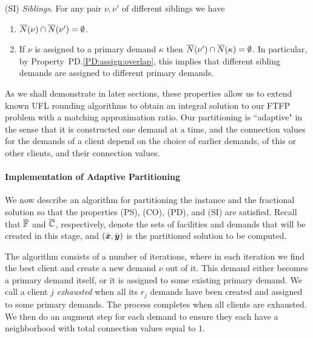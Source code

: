 \documentclass[11pt]{article}
\begin{document}
\begin{description}
\begin{enumerate}
\begin{enumerate}
			\end{enumerate}

	\end{enumerate}
	
\item{(SI)} \emph{Siblings}. For any pair $\nu,\nu'$ of different siblings we have
  \begin{enumerate}

	\item \label{SI:siblings disjoint}
		  ${\overline{N}}(\nu)\cap {\overline{N}}(\nu') = \emptyset$.
		
	\item \label{SI:primary disjoint} If $\nu$ is assigned to a primary demand $\kappa$ then
 		${\overline{N}}(\nu')\cap {\overline{N}}(\kappa) = \emptyset$. In particular, by Property~PD.\ref{PD:assign:overlap},
		this implies that different sibling demands are assigned to different primary demands.

	\end{enumerate}
	
\end{description}

As we shall demonstrate in later sections, these properties
allow us to extend known UFL rounding algorithms to obtain
an integral solution to our FTFP problem with a matching
approximation ratio. Our partitioning is ``adaptive" in the
sense that it is constructed one demand at a time, and the
connection values for the demands of a client depend on the choice of
earlier demands, of this or other clients, and their connection values.


\paragraph{Implementation of Adaptive Partitioning}
We now describe an algorithm for partitioning the instance
and the fractional solution so that the properties (PS),
(CO), (PD), and (SI) are satisfied.  Recall that
$\overline{\mathbb{F}}$ and $\overline{\mathbb{C}}$, respectively, denote the
sets of facilities and demands that will be created in this
stage, and $(\bar{\boldsymbol{x}},\bar{\boldsymbol{y}})$ is the partitioned solution
to be computed.

The algorithm consists of a number of iterations, where in
each iteration we find the best client and create a new demand
$\nu$ out of it. This demand either becomes a primary demand
itself, or it is assigned to some existing primary
demand. We call a client $j$ \emph{exhausted} when all its
$r_j$ demands have been created and assigned to some primary
demands. The process completes when all clients are
exhausted. We then do an augment step for each demand to
ensure they each have a neighborhood with total connection
values equal to $1$.
\end{document}
